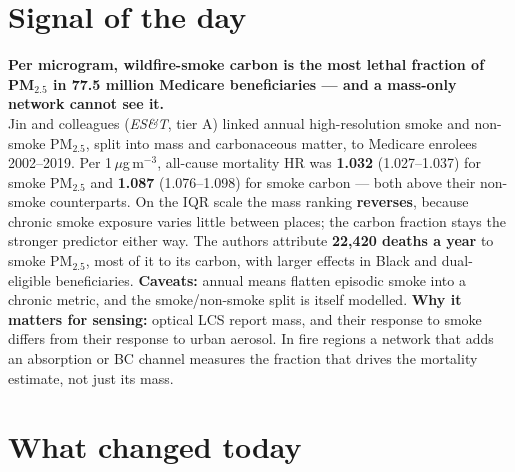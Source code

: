 \documentclass[10pt]{article}
\begin{document}
\vspace{6mm}

\section*{\sffamily\bfseries\color{Deep}Signal of the day}
\vspace{-1.5mm}{\color{Amber}\rule{\linewidth}{1.1pt}}\vspace{2.5mm}

\begin{keybox}
{\sffamily\bfseries\small\color{Deep}Per microgram, wildfire-smoke carbon is the most
lethal fraction of PM$_{2.5}$ in 77.5 million Medicare beneficiaries --- and a mass-only
network cannot see it.}\\[1.4mm]
\footnotesize
Jin and colleagues (\textit{ES\&T}, tier A) linked annual high-resolution smoke and non-smoke
PM$_{2.5}$, split into mass and carbonaceous matter, to Medicare enrolees 2002--2019. Per
1\,$\mu$g\,m$^{-3}$, all-cause mortality HR was \textbf{1.032} (1.027--1.037) for smoke PM$_{2.5}$ and
\textbf{1.087} (1.076--1.098) for smoke carbon --- both above their non-smoke counterparts. On the IQR scale
the mass ranking \textbf{reverses}, because chronic smoke exposure varies little between places; the
carbon fraction stays the stronger predictor either way. The authors attribute \textbf{22,420 deaths a
year} to smoke PM$_{2.5}$, most of it to its carbon, with larger effects in Black and dual-eligible
beneficiaries. \textbf{Caveats:} annual means flatten episodic smoke into a chronic metric, and the
smoke/non-smoke split is itself modelled. \textbf{Why it matters for sensing:} optical LCS report
mass, and their response to smoke differs from their response to urban aerosol. In fire regions a
network that adds an absorption or BC channel measures the fraction that drives the mortality
estimate, not just its mass.\par
\end{keybox}

\vspace{3mm}

\section*{\sffamily\bfseries\color{Deep}What changed today}
\vspace{-1.5mm}{\color{Amber}\rule{\linewidth}{1.1pt}}\vspace{2.5mm}
\end{document}

